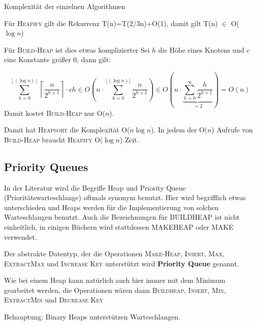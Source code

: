 Komplexität der einzelnen Algorithmen

Für \textsc{Heapify} gilt die Rekurrenz T(n)=T($2/3$n)+O(1), damit gilt T(n) $\in$ O($\log n$)

Für \textsc{Build-Heap} ist dies etwas komplizierter Sei $h$ die Höhe eines Knotens und $c$ eine Konstante größer 0, dann gilt:
 
\[\sum_{h=0}^{\left\lfloor(\log n)\right\rfloor}\left\lceil\frac{n}{2^{h+1}}\right\rceil \cdot ch \in O\left(n\cdot\sum_{h=0}^{\lfloor(\log
n)\rfloor}
\frac{n}{2^{h+1}}\right) \in O\left(n\cdot\underbrace{\sum_{h=0}^{\infty}
\frac{h}{2^{h+1}}}_{=2}\right)=O(n)\] 
Damit kostet \textsc{Build-Heap} nur O($n$).

Damit hat \textsc{Heapsort} die Komplexität O($n \log n$). In jedem der O($n$) Aufrufe von \textsc{Build-Heap}  braucht
\textsc{Heapify} O($\log n$) Zeit.
%
\subsection{Priority Queues}
In der Literatur wird die Begriffe Heap und Priority Queue (Prioritätswarteschlange) oftmals synonym benutzt. Hier wird begrifflich
etwas unterschieden und Heaps werden für die Implementierung von solchen Warteschlangen benutzt. Auch die Bezeichnungen für
\textsc{BUILDHEAP} ist nicht einheitlich, in einigen Büchern wird stattdessen \textsc{MAKEHEAP} oder \textsc{MAKE} verwendet.

\begin{definition}
Der abstrakte Datentyp, der die Operationen \textsc{Make-Heap, Insert, Max, ExtractMax} und \textsc{Increase Key} unterstützt wird
\textbf{Priority
Queue} genannt.
\end{definition}

Wie bei einem Heap kann natürlich auch hier immer mit dem Minimum gearbeitet werden, die Operationen wären dann \textsc{Buildheap,
Insert, Min, ExtractMin} und \textsc{Decrease Key}

Behauptung: Binary Heaps unterstützen Warteschlangen.

